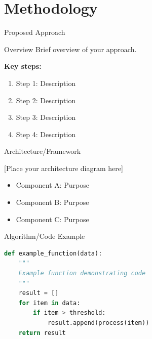 \documentclass[aspectratio=169]{beamer}
\begin{document}

\section{Methodology}

\begin{frame}{Proposed Approach}
    \begin{block}{Overview}
        Brief overview of your approach.
    \end{block}
    
    \vspace{0.3cm}
    
    \textbf{Key steps:}
    \begin{enumerate}
        \item Step 1: Description
        \item Step 2: Description
        \item Step 3: Description
        \item Step 4: Description
    \end{enumerate}
\end{frame}

\begin{frame}{Architecture/Framework}
    \begin{center}
        
        \vspace{1cm}
        [Place your architecture diagram here]
        \vspace{1cm}
    \end{center}
    
    \begin{itemize}
        \item Component A: Purpose
        \item Component B: Purpose
        \item Component C: Purpose
    \end{itemize}
\end{frame}

\begin{frame}[fragile]{Algorithm/Code Example}
    \begin{lstlisting}[language=Python]
def example_function(data):
    """
    Example function demonstrating code
    """
    result = []
    for item in data:
        if item > threshold:
            result.append(process(item))
    return result
    \end{lstlisting}
\end{frame}
\end{document}
